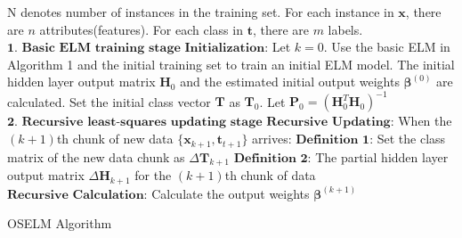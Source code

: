\documentclass[a4paper, 14pt]{extarticle}
\begin{document}
\begin{algorithm}[H]
\SetAlgoLined
{}
\BlankLine
{}  N denotes number of instances in the training set. For each instance in \( \mathbf{x}\), there are \(n\) attributes(features). For each class in \( \mathbf{t}\), there are \(m\) labels.
\BlankLine
$\textbf{1. Basic ELM training stage}$
\BlankLine
$\textbf{Initialization:}$ Let \(k = 0\). \newline Use the basic ELM in Algorithm 1 and the initial training set to train an initial ELM model. The initial hidden layer output matrix \(\mathbf{H}_0\) and the estimated initial output weights \(\mathbf{\beta}^{(0)}\) are calculated. Set the initial class vector \(\mathbf{T}\) as \(\mathbf{T}_0\). Let \(\mathbf{P}_0 = (\mathbf{H}^T_0\mathbf{H}_0)^{-1}\)
\BlankLine  
\BlankLine
$\textbf{2. Recursive least-squares updating stage}$
\BlankLine
$\textbf{Recursive Updating:}$ When the \((k+1)\)th chunk of new data \(\{\mathbf{x}_{k+1}, \mathbf{t}_{t+1}\}\) arrives:
\newline
$\textbf{Definition 1:}$ Set the class matrix of the new data chunk as \(\Delta\mathbf{T}_{k+1}\) 
\newline
$\textbf{Definition 2:}$ The partial hidden layer output matrix \(\Delta\mathbf{H}_{k+1}\) for the \((k+1)\)th chunk of data 
\newline
$\textbf{Recursive Calculation:}$ Calculate the output weights \(\mathbf{\beta}^{(k+1)}\)
\newline
{}
\BlankLine
 \caption{OSELM Algorithm}
\end{algorithm}
\end{document}
